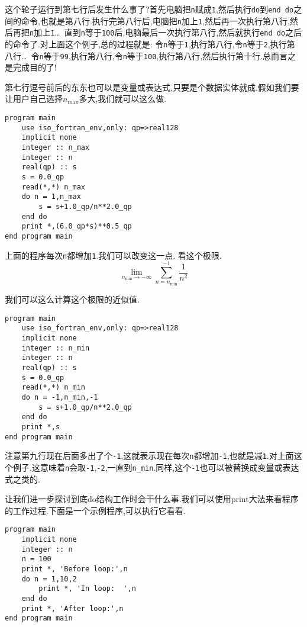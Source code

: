 这个轮子运行到第七行后发生什么事了?首先电脑把\texttt{n}赋成\texttt{1},然后执行\texttt{do}到\texttt{end do}之间的命令,也就是第八行.执行完第八行后,电脑把\texttt{n}加上\texttt{1},然后再一次执行第八行,然后再把\texttt{n}加上\texttt{1}\dots~直到\texttt{n}等于\texttt{100}后,电脑最后一次执行第八行,然后就执行\texttt{end do}之后的命令了.对上面这个例子,总的过程就是: 令\texttt{n}等于\texttt{1},执行第八行,令\texttt{n}等于\texttt{2},执行第八行\dots~令\texttt{n}等于\texttt{99},执行第八行,令\texttt{n}等于\texttt{100},执行第八行,然后执行第十行.总而言之是完成目的了!

第七行逗号前后的东东也可以是变量或表达式,只要是个数据实体就成.假如我们要让用户自己选择$n_{\text{max}}$多大,我们就可以这么做.
\begin{lstlisting}
program main
    use iso_fortran_env,only: qp=>real128
    implicit none
    integer :: n_max
    integer :: n
    real(qp) :: s
    s = 0.0_qp
    read(*,*) n_max
    do n = 1,n_max
        s = s+1.0_qp/n**2.0_qp
    end do
    print *,(6.0_qp*s)**0.5_qp
end program main
\end{lstlisting}

上面的程序每次\texttt{n}都增加\texttt{1}.我们可以改变这一点.
看这个极限.
\begin{equation*}
    \lim_{n_{\text{min}}\rightarrow-\infty}\sum_{n=n_{\text{min}}}^{-1} \frac{1}{n^2} 
\end{equation*}

我们可以这么计算这个极限的近似值.
\begin{lstlisting}
program main
    use iso_fortran_env,only: qp=>real128
    implicit none
    integer :: n_min
    integer :: n
    real(qp) :: s
    s = 0.0_qp
    read(*,*) n_min
    do n = -1,n_min,-1
        s = s+1.0_qp/n**2.0_qp
    end do
    print *,s
end program main
\end{lstlisting}
注意第九行现在后面多出了个\texttt{-1},这就表示现在每次\texttt{n}都增加\texttt{-1},也就是减\texttt{1}.对上面这个例子,这意味着\texttt{n}会取\texttt{-1},\texttt{-2},一直到\texttt{n\_{}min}.同样,这个\texttt{-1}也可以被替换成变量或表达式之类的.

让我们进一步探讨到底do结构工作时会干什么事.我们可以使用print大法来看程序的工作过程.下面是一个示例程序,可以执行它看看.
\begin{lstlisting}
program main
    implicit none
    integer :: n
    n = 100
    print *, 'Before loop:',n
    do n = 1,10,2
        print *, 'In loop:  ',n
    end do
    print *, 'After loop:',n
end program main
\end{lstlisting}

